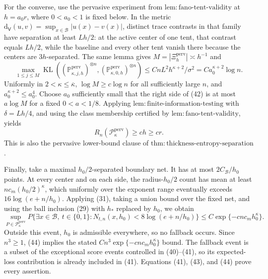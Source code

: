 For the converse, use the pervasive experiment from \(\mathrm{lem:fano\text{-}tent\text{-}validity}\) at \(h=a_0r\), where \(0<a_0<1\) is fixed below.  In the metric \(\mathrm d_{\mathsf V}(u,v)=\sup_{x\in\mathcal B}|u(x)-v(x)|\), distinct trace contrasts in that family have separation at least \(Lh/2\): at the active center of one tent, that contrast equals \(Lh/2\), while the baseline and every other tent vanish there because the centers are \(3h\)-separated.  The same lemma gives \(M=|\Xi_h^{\mathrm{perv}}|\asymp h^{-1}\) and
\[
 \max_{1\le j\le M}\operatorname{KL}
 \left((\mathbb P_{\kappa,j,h}^{\mathrm{perv}})^{\otimes n},
 (\mathbb P_{\kappa,0,h}^{\mathrm{perv}})^{\otimes n}\right)
 \le CnL^2h^{\kappa+2}/\sigma^2
 =Ca_0^{\kappa+2}\log n. \tag{42}
\]
Uniformly in \(2<\kappa\le\overline\kappa\), \(\log M\ge c\log n\) for all sufficiently large \(n\), and \(a_0^{\kappa+2}\le a_0^4\).  Choose \(a_0\) sufficiently small that the right side of (42) is at most \(a\log M\) for a fixed \(0<a<1/8\).  Applying \(\mathrm{lem:finite\text{-}information\text{-}testing}\) with \(\delta=Lh/4\), and using the class membership certified by \(\mathrm{lem:fano\text{-}tent\text{-}validity}\), yields
\[
 R_n(\mathcal P_{\kappa}^{\mathrm{perv}})
 \ge c h
 \ge c r. \tag{43}
\]
This is also the pervasive lower-bound clause of \(\mathrm{thm:thickness\text{-}entropy\text{-}separation}\).

Finally, take a maximal \(h_0/2\)-separated boundary net.  It has at most \(2C_{\mathcal B}/h_0\) points.  At every center and on each side, the radius-\(h_0/2\) count has mean at least \(nc_m(h_0/2)^{\kappa}\), which uniformly over the exponent range eventually exceeds \(16\log(e+n/h_0)\).  Applying (31), taking a union bound over the fixed net, and using the ball inclusion (29) with \(h_*\) replaced by \(h_0\), we obtain
\[
 \sup_{P\in\mathcal P_{\kappa}^{\mathrm{perv}}}
 P\{\exists x\in\mathcal B,\ t\in\{0,1\}:
 N_{t,n}(x,h_0)<8\log(e+n/h_0)\}
 \le C\exp\{-c n c_mh_0^{\kappa}\}. \tag{44}
\]
Outside this event, \(h_0\) is admissible everywhere, so no fallback occurs.  Since \(n^3\ge1\), (44) implies the stated \(Cn^3\exp\{-c n c_mh_0^{\kappa}\}\) bound.  The fallback event is a subset of the exceptional score events controlled in (40)--(41), so its expected-loss contribution is already included in (41).  Equations (41), (43), and (44) prove every assertion.